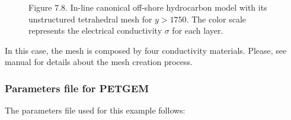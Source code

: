 \documentclass[letterpaper,10pt,english]{sphinxmanual}
\begin{document}
\begin{figure}[htbp]
\centering
\capstart

\noindent{}
\caption{Figure 7.8. In-line canonical off-shore hydrocarbon model with its unstructured tetrahedral mesh for \(y>1750\). The color scale represents the electrical conductivity \(\sigma\) for each layer.}\label{\detokenize{Manual:id21}}\label{\detokenize{Manual:figure-7-8}}\end{figure}

In this case, the mesh is composed by four conductivity materials. Please, see
 manual for details about the mesh creation process.


\subsubsection{Parameters file for PETGEM}
\label{\detokenize{Manual:parameters-file-for-petgem}}
The parameters file used for this example follows:
\end{document}
